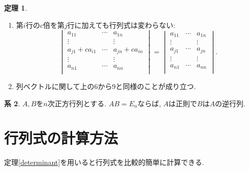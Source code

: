 \documentclass[dvipdfmx,a4paper,11pt]{article}
\theoremstyle{definition}
\newtheorem{thm}{定理}
\newtheorem{cor}[thm]{系}
\begin{document}
\begin{tcolorbox}[
    colback = white,
    colframe = green!35!black,
    fonttitle = \bfseries,
    breakable = true]
\begin{thm}
\begin{enumerate}
$$\begin{vmatrix}
\vdots& 		   &	\vdots \\
a_{n1}	& \cdots &a_{nn} \\
\end{vmatrix}
= (-1)
\begin{vmatrix}
a_{11}&  \cdots &a_{1n} \\
\vdots&	 	  &	\vdots \\
a_{i1} & \cdots & a_{in} \\
\vdots& 		   &	\vdots \\
a_{j1} & \cdots & a_{jn} \\
\vdots& 		   &	\vdots \\
a_{n1}	& \cdots &a_{nn} \\
\end{vmatrix}.
$$
\item 第$i$行の$c$倍を第$j$行に加えても行列式は変わらない:
$$
\begin{vmatrix}
a_{11}&  \cdots &a_{1n} \\
\vdots& 		   &	\vdots \\
a_{j1} +ca_{i1}& \cdots & a_{jn} +ca_{in}\\
\vdots& 		   &	\vdots \\
a_{n1}	& \cdots &a_{nn} \\
\end{vmatrix}
= 
\begin{vmatrix}
a_{11}&  \cdots &a_{1n} \\
\vdots& 		   &	\vdots \\
a_{j1} & \cdots & a_{jn} \\
\vdots& 		   &	\vdots \\
a_{n1}	& \cdots &a_{nn} \\
\end{vmatrix}.
$$
\item 列ベクトルに関して上の6から9と同様のことが成り立つ.
\end{enumerate}
  \end{thm}
 \end{tcolorbox}
 
 \begin{tcolorbox}[
    colback = white,
    colframe = green!35!black,
    fonttitle = \bfseries,
    breakable = true]
    \begin{cor}
$A,B$を$n$次正方行列とする. $AB=E_n$ならば, $A$は正則で$B$は$A$の逆行列.
  \end{cor}
 \end{tcolorbox}
 
 \section{行列式の計算方法}
 定理\ref{determinant}を用いると行列式を比較的簡単に計算できる.
 
\end{document}
